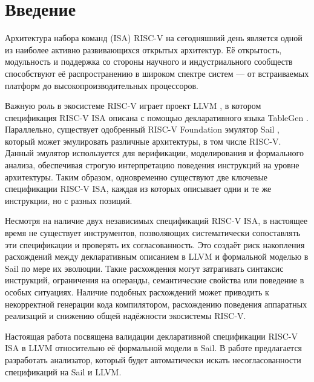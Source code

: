 
\section*{Введение}
\thispagestyle{withCompileDate}

Архитектура набора команд (ISA) RISC-V \cite{waterman2014risc} на сегодняшний день является одной из наиболее активно развивающихся открытых архитектур. Её открытость, модульность и поддержка со стороны научного и индустриального сообществ способствуют её распространению в широком спектре систем — от встраиваемых платформ до высокопроизводительных процессоров.

Важную роль в экосистеме RISC-V играет проект LLVM \cite{lattner2004llvm}, в котором спецификация RISC-V ISA описана с помощью декларативного языка TableGen \cite{tblgen}. Параллельно, существует одобренный RISC-V Foundation эмулятор Sail \cite{gray2017sail}, который может эмулировать различные архитектуры, в том числе RISC-V. Данный эмулятор используется для верификации, моделирования и формального анализа, обеспечивая строгую интерпретацию поведения инструкций на уровне архитектуры. Таким образом, одновременно существуют две ключевые спецификации RISC-V ISA, каждая из которых описывает одни и те же инструкции, но с разных позиций.

Несмотря на наличие двух независимых спецификаций RISC-V ISA, в настоящее время не существует инструментов, позволяющих систематически сопоставлять эти спецификации и проверять их согласованность. Это создаёт риск накопления расхождений между декларативным описанием в LLVM и формальной моделью в Sail по мере их эволюции. Такие расхождения могут затрагивать синтаксис инструкций, ограничения на операнды, семантические свойства или поведение в особых ситуациях. Наличие подобных расхождений может приводить к некорректной генерации кода компилятором, расхождению поведения аппаратных реализаций и снижению общей надёжности экосистемы RISC-V.

Настоящая работа посвящена валидации декларативной спецификации RISC-V ISA в LLVM относительно её формальной модели в Sail. В работе предлагается разработать анализатор, который будет автоматически искать несогласованности спецификаций на Sail и LLVM.



